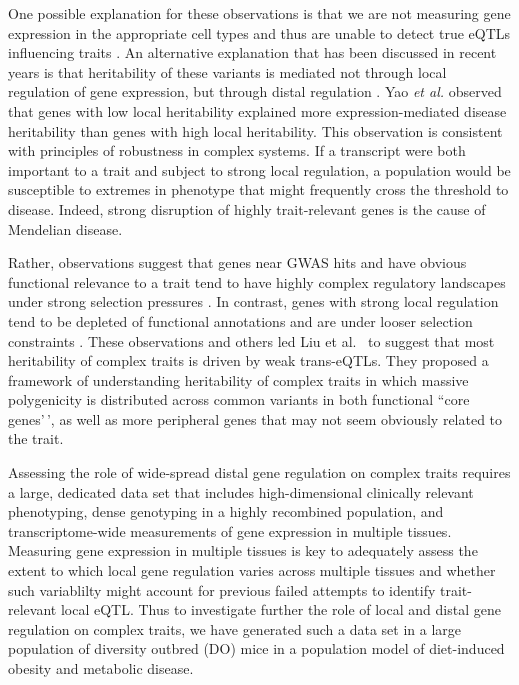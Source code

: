 \documentclass[
]{article}
\begin{document}
One possible explanation for these observations is that we are not
measuring gene expression in the appropriate cell types and thus are
unable to detect true eQTLs influencing traits \cite{pmid32912663}. An
alternative explanation that has been discussed in recent years is that
heritability of these variants is mediated not through local regulation
of gene expression, but through distal regulation
\cite{pmid37857933, pmid32424349, 
pmid32831138, pmid30950127}. Yao \textit{et al.} \cite{pmid32424349}
observed that genes with low local heritability explained more
expression-mediated disease heritability than genes with high local
heritability. This observation is consistent with principles of
robustness in complex systems. If a transcript were both important to a
trait and subject to strong local regulation, a population would be
susceptible to extremes in phenotype that might frequently cross the
threshold to disease. Indeed, strong disruption of highly trait-relevant
genes is the cause of Mendelian disease.

Rather, observations suggest that genes near GWAS hits and have obvious
functional relevance to a trait tend to have highly complex regulatory
landscapes under strong selection pressures \cite{pmid37857933}. In
contrast, genes with strong local regulation tend to be depleted of
functional annotations and are under looser selection constraints
\cite{pmid37857933}. These observations and others led Liu et al.~
\cite{pmid31051098} to suggest that most heritability of complex traits
is driven by weak trans-eQTLs. They proposed a framework of
understanding heritability of complex traits in which massive
polygenicity is distributed across common variants in both functional
``core genes'\,', as well as more peripheral genes that may not seem
obviously related to the trait.

Assessing the role of wide-spread distal gene regulation on complex
traits requires a large, dedicated data set that includes
high-dimensional clinically relevant phenotyping, dense genotyping in a
highly recombined population, and transcriptome-wide measurements of
gene expression in multiple tissues. Measuring gene expression in
multiple tissues is key to adequately assess the extent to which local
gene regulation varies across multiple tissues and whether such
variablilty might account for previous failed attempts to identify
trait-relevant local eQTL. Thus to investigate further the role of local
and distal gene regulation on complex traits, we have generated such a
data set in a large population of diversity outbred (DO) mice
\cite{pmid22892839} in a population model of diet-induced obesity and
metabolic disease.
\end{document}
